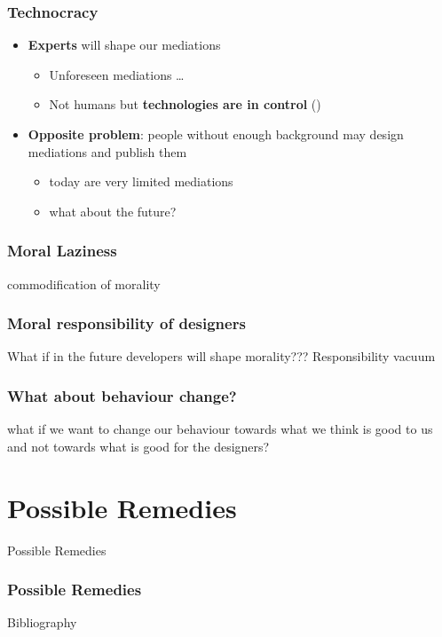 \documentclass{beamer}
\begin{document}
\begin{frame}
	\frametitle{Technocracy}

	\begin{itemize}
		\item \textbf{Experts} will shape our mediations
		\begin{itemize}
			\item Unforeseen mediations \dots
			\item Not humans but \textbf{technologies are in control} (\cite{verbeek2011moralizing})
		\end{itemize}
	     \bigskip
		\item \textbf{Opposite problem}: people without enough background may design mediations and publish them
		\begin{itemize}
			\item today are very limited mediations
			\item what about the future?
		\end{itemize}
	\end{itemize}
\end{frame}

\begin{frame}
\frametitle{Moral Laziness}
commodification of morality
\end{frame}

\begin{frame}
	\frametitle{Moral responsibility of designers}
	What if in the future developers will shape morality??? Responsibility vacuum	
\end{frame}

\begin{frame}
\frametitle{What about behaviour change?}
what if we want to change our behaviour towards what we think is good to us and not towards what is good for the designers?
\end{frame}

\section{Possible Remedies}
\begin{frame}
\begin{center} 
	 Possible Remedies
\end{center}
\end{frame}

\begin{frame}
\frametitle{Possible Remedies}
\end{frame}

\nocite{*}
\begin{frame}{Bibliography}
\renewcommand*{\bibfont}{\small}
\printbibliography
\end{frame}
\end{document}
